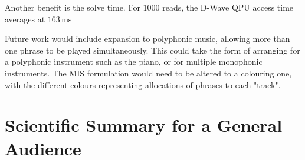 \documentclass[aps,pra,10pt,twocolumn]{revtex4-2}
\begin{document}
Another benefit is the solve time. For 1000 reads, the D-Wave QPU access time averages at $163\,\textrm{ms}$

Future work would include expansion to polyphonic music, allowing more than one phrase to be played simultaneously. This could take the form of arranging for a polyphonic instrument such as the piano, or for multiple monophonic instruments. The MIS formulation would need to be altered to a colouring one, with the different colours representing allocations of phrases to each "track".

\nocite{*}


\clearpage

\onecolumngrid %

\section*{Scientific Summary for a General Audience}

\lipsum[1]
\end{document}
